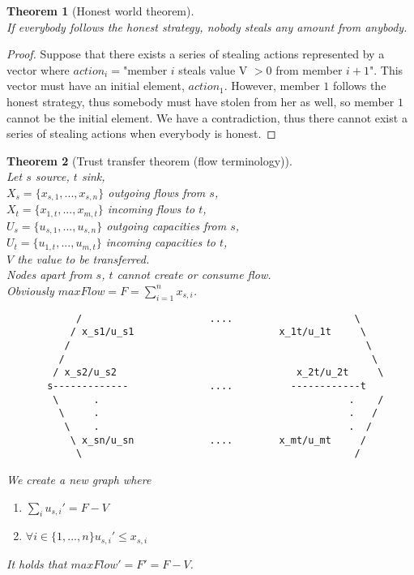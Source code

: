 \documentclass[11pt]{article}
\newtheorem{theorem}{Theorem}[section]
\theoremstyle{definition}
\theoremstyle{corollary}
\begin{document}
    \begin{theorem}[Honest world theorem] \ \\
    \label{honestworld}
       If everybody follows the honest strategy, nobody steals any amount from anybody.
    \end{theorem}
    \begin{proof}
       Suppose that there exists a series of stealing actions represented by a vector where $action_i = $"member $i$ steals
       value V $>0$ from member $i+1$". This vector must have an initial element, $action_1$. However, member $1$ follows
       the honest strategy, thus somebody must have stolen from her as well, so member $1$ cannot be the initial element.
       We have a contradiction, thus there cannot exist a series of stealing actions when everybody is honest.
    \end{proof}
    \begin{theorem}[Trust transfer theorem (flow terminology)] \ \\
    \label{trusttransfer}
       Let $s$ source, $t$ sink, \\
       $X_s = \{x_{s, 1}, ..., x_{s, n}\}$ outgoing flows from $s$, \\
       $X_t = \{x_{1, t}, ..., x_{m, t}\}$ incoming flows to $t$, \\
       $U_s = \{u_{s, 1}, ..., u_{s, n}\}$ outgoing capacities from $s$, \\
       $U_t = \{u_{1, t}, ..., u_{m, t}\}$ incoming capacities to $t$, \\
       $V$ the value to be transferred. \\
       Nodes apart from $s$, $t$ cannot create or consume flow. \\
       Obviously $maxFlow = F = \sum_{i=1}^{n}{x_{s, i}}$.
       {\em \begin{lstlisting}
            /                      ....                     \
           / x_s1/u_s1                         x_1t/u_1t     \
          /                                                   \
         /                                                     \
        / x_s2/u_s2                               x_2t/u_2t     \
       s-------------              ....          ------------t
        \      .                                           .    /
         \     .                                           .   /
          \    .                                           .  /
           \ x_sn/u_sn             ....        x_mt/u_mt     /
            \                                               /
       \end{lstlisting}}
       We create a new graph where
       \begin{enumerate}
         \item  $\sum_{i}{u_{s, i}'} = F - V$
         \item $\forall i \in \{1,...,n\} u_{s, i}' \leq x_{s, i}$
       \end{enumerate}
 
       It holds that $maxFlow' = F' = F - V$.
    \end{theorem}
\end{document}
